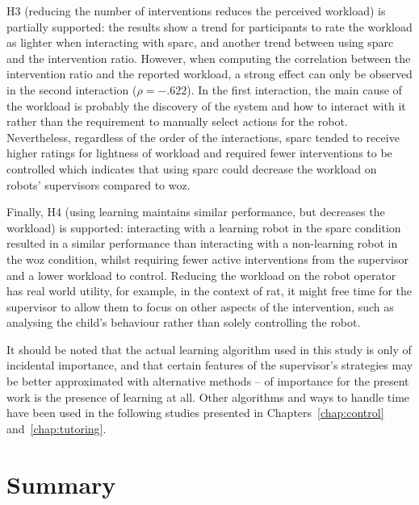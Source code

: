 H3 (reducing the number of interventions reduces the perceived workload) is partially supported: the results show a trend for participants to rate the workload as lighter when interacting with \gls{sparc}, and another trend between using \gls{sparc} and the intervention ratio. However, when computing the correlation between the intervention ratio and the reported workload, a strong effect can only be observed in the second interaction ($\rho = -.622$). In the first interaction, the main cause of the workload is probably the discovery of the system and how to interact with it rather than the requirement to manually select actions for the robot. Nevertheless, regardless of the order of the interactions, \gls{sparc} tended to receive higher ratings for lightness of workload and required fewer interventions to be controlled which indicates that using \gls{sparc} could decrease the workload on robots' supervisors compared to \gls{woz}.

Finally, H4 (using learning maintains similar performance, but decreases the workload) is supported: interacting with a learning robot in the \gls{sparc} condition resulted in a similar performance than interacting with a non-learning robot in the \gls{woz} condition, whilst requiring fewer active interventions from the supervisor and a lower workload to control. Reducing the workload on the robot operator has real world utility, for example, in the context of \gls{rat}, it might free time for the supervisor to allow them to focus on other aspects of the intervention, such as analysing the child's behaviour rather than solely controlling the robot. 

It should be noted that the actual learning algorithm used in this study is only of incidental importance, and that certain features of the supervisor's strategies may be better approximated with alternative methods -- of importance for the present work is the presence of learning at all. Other algorithms and ways to handle time have been used in the following studies presented in Chapters~\ref{chap:control} and~\ref{chap:tutoring}.

\section{Summary}


